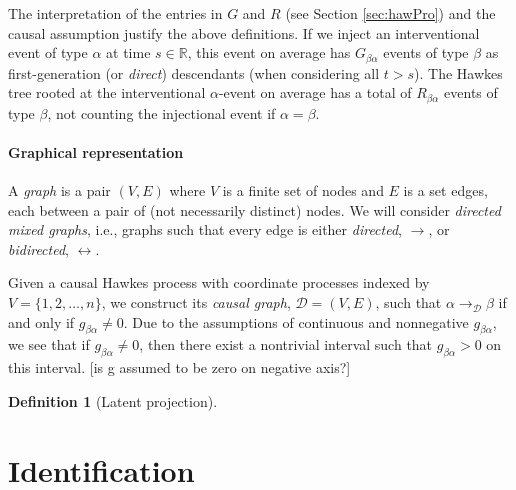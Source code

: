 \documentclass[accepted]{uai2021} %
\newtheorem{defn}[thm]{Definition}
\begin{document}
The interpretation of the entries in $G$ and $R$ (see Section 
\ref{sec:hawPro}) and the causal assumption justify the above definitions. If 
we inject an 
interventional event of type $\alpha$ at time $s \in \mathbb{R}$, this 
event on average has $G_{\beta\alpha}$ events 
of type $\beta$ as first-generation (or \emph{direct}) descendants (when 
considering all $t > s$). The Hawkes tree rooted at the 
interventional $\alpha$-event on average has a total of $R_{\beta\alpha}$ 
events of 
type $\beta$, not counting the injectional event if $\alpha=\beta$. 


\paragraph{Graphical representation}

A {\it graph} is a pair $(V,E)$ where $V$ is a finite set of nodes and $E$ is a 
set edges, each between a pair of (not necessarily distinct) nodes. We will  
consider {\it directed mixed graphs}, i.e., graphs such that every edge is 
either \emph{directed}, $\rightarrow$, or \emph{bidirected}, $\leftrightarrow$. 

Given a causal Hawkes process with coordinate processes indexed by $V = 
\{1,2,\ldots,n\}$, we construct its \emph{causal graph}, $\mathcal{D} = (V,E)$, 
such that 
$\alpha \rightarrow_\mathcal{D} \beta$ if and only if $g_{\beta\alpha} \neq 0$. 
Due 
to the assumptions of continuous and nonnegative $g_{\beta\alpha}$, we see 
that if $g_{\beta\alpha}\neq 0$, then there exist a nontrivial interval such 
that $g_{\beta\alpha} > 0$ on this interval. [is g assumed to be zero on 
negative axis?]

\begin{defn}[Latent projection]
	\label{def:latProj}
\end{defn}



\section{Identification}
\end{document}
